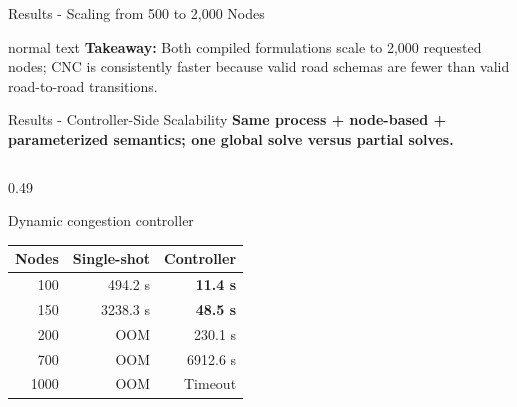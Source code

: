 \documentclass[10pt,aspectratio=169]{beamer}
\newcommand{\takeaway}[1]{%
  \begin{beamercolorbox}[rounded=true,sep=0.65ex,wd=\linewidth]{normal text}%
    \textbf{Takeaway:} #1
  \end{beamercolorbox}%
}
\begin{document}
\begin{frame}{Results - Scaling from 500 to 2,000 Nodes}
  \vspace{-0.10cm}
  \takeaway{Both compiled formulations scale to 2,000 requested nodes; CNC is consistently faster because valid road schemas are fewer than valid road-to-road transitions.}
\end{frame}

\begin{frame}{Results - Controller-Side Scalability}
  \textbf{Same process + node-based + parameterized semantics; one global solve versus partial solves.}

  \vspace{0.25cm}
  \begin{columns}[T,onlytextwidth]
    \begin{column}{0.49\textwidth}
      \begin{beamerboxesrounded}[upper=block title,lower=block body,shadow=true]{Dynamic congestion controller}
        \centering\scriptsize
        \begin{tabular}{@{}r r r@{}}
          \toprule
          Nodes & Single-shot & Controller \\
          \midrule
          100  & 494.2 s  & \textbf{11.4 s} \\
          150  & 3238.3 s & \textbf{48.5 s} \\
          200  & \textcolor{RoutlyRed}{OOM} & 230.1 s \\
          700  & \textcolor{RoutlyRed}{OOM} & 6912.6 s \\
          1000 & \textcolor{RoutlyRed}{OOM} & Timeout \\
          \bottomrule
        \end{tabular}


\end{beamerboxesrounded}
\end{column}
\end{columns}
\end{frame}
\end{document}

